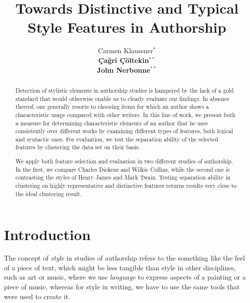 \documentclass[a4paper,10pt,twoside,fleqn]{article}
\begin{document}
\title{Towards Distinctive and Typical Style Features in Authorship}


\author{Carmen Klaussner$^*$ \\
{\normalsize \bf \c{C}a\u{g}ri \c{C}öltekin}$^{**}$ \\
{\normalsize \bf John Nerbonne}$^{**}$ 
\AND {}
\AND {} }


\maketitle\thispagestyle{empty} %


\begin{abstract}
Detection of stylistic elements in authorship studies is hampered
by the lack of a gold standard that would otherwise enable us to 
clearly evaluate our findings. In absence thereof, one generally 
resorts to choosing items for which an author shows a 
characteristic usage compared with other writers. 
In this line of work, we present both a measure for determining 
characteristic elements of an author that he uses consistently
over different works by examining different types of features, 
both lexical and syntactic ones.
For evaluation, we test the separation ability of the selected 
features by clustering the data set on their basis.

We apply both feature selection and evaluation in two different
studies of authorship. In the first, we compare Charles Dickens 
and Wilkie Collins, while the second one is contrasting the 
styles of Henry James and Mark Twain. Testing separation ability 
in clustering on highly representative and distinctive features 
returns results very close to the ideal clustering result.
\end{abstract}




\section{Introduction}
The concept of \emph{style} in studies of authorship refers to the 
something like the feel of a piece of text, which might be less
tangible than style in other disciplines, such as art or music, 
where we use \emph{language} to express aspects of a 
painting or a piece of music, whereas for style in writing, 
we have to use the same tools that were used to create it. 
\end{document}
